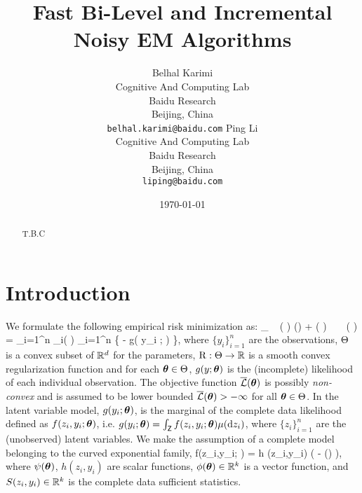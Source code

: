\documentclass[11pt]{article}
\theoremstyle{t}
\begin{document}
\title{Fast Bi-Level and Incremental Noisy EM Algorithms}
\author{
  Belhal Karimi \\
  Cognitive And Computing Lab\\
  Baidu Research\\
  Beijing, China \\
  \texttt{belhal.karimi@baidu.com} 
   \And
  Ping Li \\
  Cognitive And Computing Lab\\
  Baidu Research\\
  Beijing, China \\
  \texttt{liping@baidu.com} }
\date{\today}

\maketitle

\begin{abstract}
T.B.C
\end{abstract}


\section{Introduction}
We formulate the following empirical risk minimization as:
\beq \label{eq:em_motivate}
\min_{ \param \in \Param }~ \overline{\calL} ( \param ) \eqdef \Pen (\param) + \calL ( \param )~~~~\calL ( \param ) =  \sum_{i=1}^n \calL_i( \param) \eqdef  {} \sum_{i=1}^n \big\{ - \log g( y_i ; \param ) \big\}\eqs,
\eeq
where $\{y_i\}_{i=1}^n$ are the observations, $\Theta$ is a convex subset of $\mathbb{R}^d$ for the parameters,  $\operatorname{R} : \Theta \rightarrow \mathbb{R}$ is a smooth convex regularization function   and for each ${\bm{\theta}} \in \Theta$, $g(y;{\bm{\theta}})$ is the (incomplete) likelihood of each individual  observation.
The objective function $ \overline{{\mathcal{L}}} ( {\bm{\theta}} )$ is possibly \emph{non-convex} and is assumed to be lower bounded $ \overline{{\mathcal{L}}} ( {\bm{\theta}} ) > - \infty$ for all ${\bm{\theta}} \in \Theta$.
In the latent variable model,  $g(y_i ; {\bm{\theta}})$, is the marginal of the
complete data likelihood defined as $f(z_i,y_i; {\bm{\theta}})$, i.e. $g(y_i; {\bm{\theta}}) = \int_{\mathsf{Z}} f (z_i,y_i;{\bm{\theta}}) \mu(\mathrm d z_i)$, where $\{ z_i \}_{i=1}^n$ are the (unobserved)
latent variables.   
We make the assumption of a complete model belonging to the curved exponential family, \ie
\beq \label{eq:exp}
f(z_i,y_i; \param) = h  (z_i,y_i) \exp \big(  - \psi(\param) \big)\eqs,
\eeq
where $\psi({\bm{\theta}})$, $h(z_i,y_i)$ are scalar functions, $\phi({\bm{\theta}}) \in \mathbb{R}^k$ is a vector function, and $S(z_i,y_i) \in \mathbb{R}^k$ is the complete data sufficient statistics.
\end{document}
